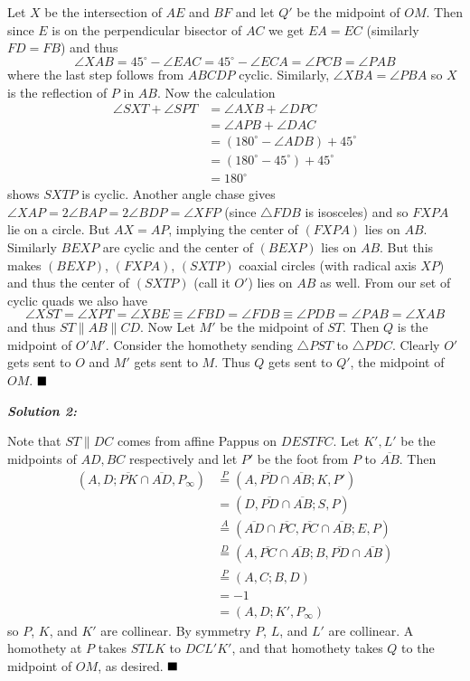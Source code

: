 \documentclass[12pt]{article}
\newcommand{\solnum}[1]{\textbf{\textit{Solution #1: }}}
\begin{document}
\begin{enumerate}[topsep=2\bigskipamount,itemsep=\bigskipamount]
Let $X$ be the intersection of $AE$ and $BF$ and let $Q'$ be the midpoint of $OM$.
Then since $E$ is on the perpendicular bisector of $AC$ we get $EA=EC$ (similarly $FD=FB$) and thus
\[\angle XAB = 45^{\circ}-\angle EAC=45^{\circ}-\angle ECA=\angle PCB=\angle PAB\]
where the last step follows from $ABCDP$ cyclic.
Similarly, $\angle XBA=\angle PBA$ so $X$ is the reflection of $P$ in $AB$.
Now the calculation
\begin{align*}
    \angle SXT + \angle SPT &= \angle AXB + \angle DPC\\
    &= \angle APB + \angle DAC\\
    &= (180^{\circ}-\angle ADB) + 45^{\circ}\\
    &= (180^{\circ}-45^{\circ}) + 45^{\circ}\\
    &= 180^{\circ}
\end{align*}
shows $SXTP$ is cyclic. Another angle chase gives $\angle XAP = 2\angle BAP = 2\angle BDP=\angle XFP$ (since $\triangle FDB$ is isosceles) and so $FXPA$ lie on a circle.
But $AX=AP$, implying the center of $(FXPA)$ lies on $AB$.
Similarly $BEXP$ are cyclic and the center of $(BEXP)$ lies on $AB$.
But this makes $(BEXP)$, $(FXPA)$, $(SXTP)$ coaxial circles (with radical axis $XP$) and thus the center of $(SXTP)$ (call it $O'$) lies on $AB$ as well.
From our set of cyclic quads we also have \[\angle XST = \angle XPT = \angle XBE\equiv\angle FBD = \angle FDB\equiv\angle PDB = \angle PAB = \angle XAB \] and thus $ST\parallel AB\parallel CD$.
Now Let $M'$ be the midpoint of $ST$.
Then $Q$ is the midpoint of $O'M'$.
Consider the homothety sending $\triangle PST$ to $\triangle PDC$.
Clearly $O'$ gets sent to $O$ and $M'$ gets sent to $M$.
Thus $Q$ gets sent to $Q'$, the midpoint of $OM$.
$\hfill\blacksquare$

\solnum{2}

Note that $ST \parallel DC$ comes from affine Pappus on $DESTFC$.
Let $K',L'$ be the midpoints of $AD,BC$ respectively and let $P'$ be the foot from $P$ to $\overline{AB}$.
Then
\begin{align*}
    (A,D;\overline{PK}\cap\overline{AD},P_{\infty}) &\overset{P}{=} (A,\overline{PD}\cap\overline{AB};K,P')\\
    &= (D,\overline{PD}\cap\overline{AB};S,P)\\
    &\overset{A}{=} (\overline{AD}\cap\overline{PC},\overline{PC}\cap\overline{AB};E,P)\\
    &\overset{D}{=} (A,\overline{PC}\cap\overline{AB};B,\overline{PD}\cap\overline{AB})\\
    &\overset{P}{=} (A,C;B,D)\\
    &= -1\\
    &= (A,D;K',P_{\infty})
\end{align*}
so $P$, $K$, and $K'$ are collinear.
By symmetry $P$, $L$, and $L'$ are collinear.
A homothety at $P$ takes $STLK$ to $DCL'K'$, and that homothety takes $Q$ to the midpoint of $OM$, as desired. $\hfill\blacksquare$


\end{enumerate}
\end{document}
